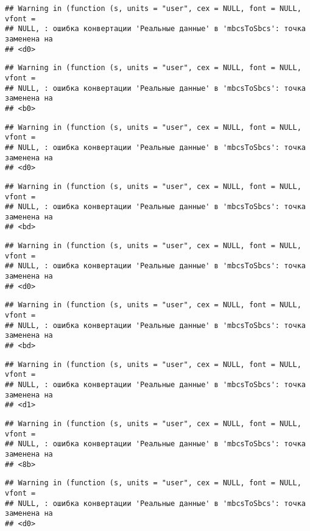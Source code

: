 \documentclass[
]{article}
\begin{document}
\begin{verbatim}
## Warning in (function (s, units = "user", cex = NULL, font = NULL, vfont =
## NULL, : ошибка конвертации 'Реальные данные' в 'mbcsToSbcs': точка заменена на
## <d0>
\end{verbatim}

\begin{verbatim}
## Warning in (function (s, units = "user", cex = NULL, font = NULL, vfont =
## NULL, : ошибка конвертации 'Реальные данные' в 'mbcsToSbcs': точка заменена на
## <b0>
\end{verbatim}

\begin{verbatim}
## Warning in (function (s, units = "user", cex = NULL, font = NULL, vfont =
## NULL, : ошибка конвертации 'Реальные данные' в 'mbcsToSbcs': точка заменена на
## <d0>
\end{verbatim}

\begin{verbatim}
## Warning in (function (s, units = "user", cex = NULL, font = NULL, vfont =
## NULL, : ошибка конвертации 'Реальные данные' в 'mbcsToSbcs': точка заменена на
## <bd>
\end{verbatim}

\begin{verbatim}
## Warning in (function (s, units = "user", cex = NULL, font = NULL, vfont =
## NULL, : ошибка конвертации 'Реальные данные' в 'mbcsToSbcs': точка заменена на
## <d0>
\end{verbatim}

\begin{verbatim}
## Warning in (function (s, units = "user", cex = NULL, font = NULL, vfont =
## NULL, : ошибка конвертации 'Реальные данные' в 'mbcsToSbcs': точка заменена на
## <bd>
\end{verbatim}

\begin{verbatim}
## Warning in (function (s, units = "user", cex = NULL, font = NULL, vfont =
## NULL, : ошибка конвертации 'Реальные данные' в 'mbcsToSbcs': точка заменена на
## <d1>
\end{verbatim}

\begin{verbatim}
## Warning in (function (s, units = "user", cex = NULL, font = NULL, vfont =
## NULL, : ошибка конвертации 'Реальные данные' в 'mbcsToSbcs': точка заменена на
## <8b>
\end{verbatim}

\begin{verbatim}
## Warning in (function (s, units = "user", cex = NULL, font = NULL, vfont =
## NULL, : ошибка конвертации 'Реальные данные' в 'mbcsToSbcs': точка заменена на
## <d0>
\end{verbatim}
\end{document}
